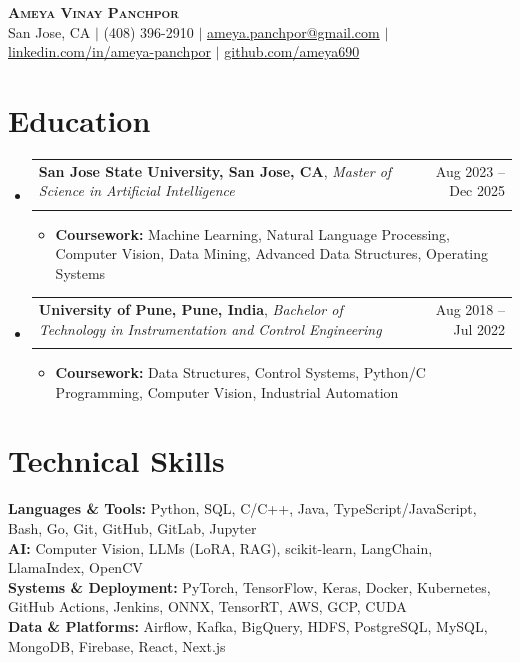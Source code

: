 \documentclass[letterpaper,10pt]{article}
\makeatletter
\newcommand{\resumeItem}[1]{
  \item[$\vcenter{\hbox{\tiny$\bullet$}}$]\small{
    #1 \vspace{-2pt}
  }
}
\newcommand{\resumeSubheading}[4]{
  \vspace{-2pt}\item
  \begin{tabular*}{0.97\textwidth}{l@{\extracolsep{\fill}}r}
    \textbf{\small #1}, \textit{\small #3} & {\small #2} \\
    & \textit{\small \textcolor{black}{#4}} \\
  \end{tabular*}\vspace{-7pt}
}
\newcommand{\resumeSubHeadingListStart}{\begin{itemize}[leftmargin=0.15in, label={}]}\newcommand{\resumeSubHeadingListEnd}{\end{itemize}}
\newcommand{\resumeItemListStart}{\begin{itemize}}
\newcommand{\resumeItemListEnd}{\end{itemize}\vspace{-5pt}}
\makeatother
\begin{document}
\begin{center}
    \textbf{\Huge \scshape Ameya Vinay Panchpor} \\ \vspace{5pt}
    San Jose, CA $|$ (408) 396-2910 $|$
    \href{mailto:ameya.panchpor@gmail.com}{ameya.panchpor@gmail.com} $|$
    \href{https://www.linkedin.com/in/ameya-panchpor}{linkedin.com/in/ameya-panchpor} $|$
    \href{https://github.com/ameya690}{github.com/ameya690}
\end{center}

\section{\textbf{Education}}
  \resumeSubHeadingListStart
    \resumeSubheading
      {San Jose State University, San Jose, CA}{Aug 2023 -- Dec 2025}
      {Master of Science in Artificial Intelligence}{}
      \resumeItemListStart
        \resumeItem{\textbf{Coursework:} Machine Learning, Natural Language Processing, Computer Vision, Data Mining, Advanced Data Structures, Operating Systems}
      \resumeItemListEnd

    \resumeSubheading
      {University of Pune, Pune, India}{Aug 2018 -- Jul 2022}
      {Bachelor of Technology in Instrumentation and Control Engineering}{}
      \resumeItemListStart
        \resumeItem{\textbf{Coursework:} Data Structures, Control Systems, Python/C Programming, Computer Vision, Industrial Automation}
      \resumeItemListEnd
  \resumeSubHeadingListEnd

\section{\textbf{Technical Skills}}
\begin{itemize}[leftmargin=0.15in, label={}]
\small{\item{
  \textbf{Languages \& Tools:} Python, SQL, C/C++, Java, TypeScript/JavaScript, Bash, Go, Git, GitHub, GitLab, Jupyter \\
  \textbf{AI:} Computer Vision, LLMs (LoRA, RAG),  scikit-learn, LangChain, LlamaIndex, OpenCV \\
  \textbf{Systems \& Deployment:} PyTorch, TensorFlow, Keras, Docker, Kubernetes, GitHub Actions, Jenkins, ONNX, TensorRT, AWS, GCP, CUDA \\
  \textbf{Data \& Platforms:} Airflow, Kafka, BigQuery, HDFS, PostgreSQL, MySQL, MongoDB, Firebase, React, Next.js
}}
\end{itemize}
\end{document}

